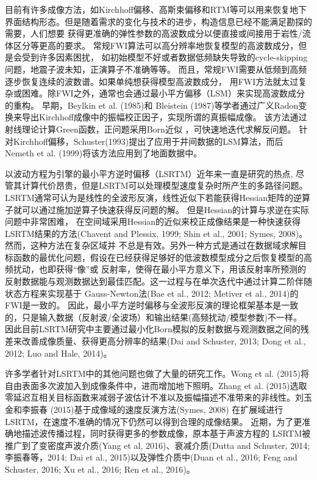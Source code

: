 目前有许多成像方法，如Kirchhoff偏移、高斯束偏移和RTM等可以用来恢复地下界面结构形态。但是随着需求的变化与技术的进步，构造信息已经不能满足勘探的需要，人们想要
获得更准确的弹性参数的高波数成分以便直接或间接用于岩性/流体区分等更高的要求。
常规FWI算法可以高分辨率地恢复模型的高波数成分，但是会受到许多因素困扰，
如初始模型不好或者数据低频缺失导致的cycle-skipping问题，地震子波未知，正演算子不准确等等。
而且，常规FWI需要从低频到高频逐步恢复连续的波数谱。如果单纯想获得模型高波数成分，
用FWI方法就太过复杂或困难。除FWI之外，通常也会通过最小平方偏移（LSM）来实现高波数成分的重构。
早期，Beylkin
et al. (1985)\cite{BeylkinEtAl1985}和
Bleistein (1987)\cite{Bleistein1987}等学者通过广义Radon变换来导出Kirchhoff成像中的振幅校正因子，实现所谓的真振幅成像。
该方法通过射线理论计算Green函数，正问题采用Born近似
，可快速地迭代求解反问题。
针对Kirchhoff偏移，Schuster(1993)\cite{Schuster1993}提出了应用于井间数据的LSM算法，而后Nemeth et al.
(1999)\cite{Nemeth1999}将该方法应用到了地面数据中。

以波动方程为引擎的最小平方逆时偏移（LSRTM）近年来一直是研究的热点,
尽管其计算代价昂贵，但是LSRTM可以处理模型速度复杂时所产生的多路径问题。
LSRTM通常可认为是线性的全波形反演，线性近似下若能获得Hessian矩阵的逆算子就可以通过施加逆算子快速获得反问题的解。
但是Hessian的计算与求逆在实际问题中非常困难，
在空间域采用Hessian的近似来校正成像结果是一种快速获得LSRTM结果的方法(Chavent and Plessix, 
1999\cite{ChaventEtAl1999}; Shin et al., 2001\cite{shin2001improved}; Symes,
2008\cite{Symes2008})。然而，这种方法在复杂区域并
不总是有效。另外一种方式是通过在数据域求解目标函数的最优化问题，假设在已经获得足够好的低波数模型成分之后恢复模型的高频扰动，也即获得“像”或
反射率，使得在最小平方意义下，用该反射率所预测的反射数据能与观测数据达到最佳匹配。这一过程与在单次迭代中通过计算二阶伴随状态方程来实现基于
Gauss-Newton法(Bae et al., 2012\cite{bae2012frequency}; Metiver et al.,
2014\cite{Metivier2014})的FWI是一致的。
因此，最小平方逆时偏移与全波形反演的理论框架基本是一致的，只是输入数据（反射波/全波场）和输出结果(高频扰动/模型参数)不一样。
因此目前LSRTM研究中主要通过最小化Born模拟的反射数据与观测数据之间的残差来改善成像质量、获得更高分辨率的结果(Dai and
Schuster, 2013\cite{Dai2013}; Dong et al., 2012\cite{Dong2012}; Luo and
Hale, 2014\cite{Luo2014})。

许多学者针对LSRTM中的其他问题也做了大量的研究工作。Wong et al.
(2015)\cite{WongEtAl2015}将自由表面多次波加入到成像条件中，进而增加地下照明。Zhang et al.
(2015)\cite{ZhangEtAl2015}选取零延迟互相关目标函数来减弱子波估计不准以及振幅描述不准带来的非线性。刘玉金和李振春
(2015)\cite{刘玉金2015}基于成像域的速度反演方法(Symes, 2008\cite{Symes2008a})
在扩展域进行LSRTM，在速度不准确的情况下仍然可以得到合理的成像结果。
近期，为了更准确地描述波传播过程，同时获得更多的参数成像，原本基于声波方程的
LSRTM被推广到了变密度声波介质(Yang et al, 2016)\cite{Yang2016}、衰减介质(Dutta and
Schuster, 2014\cite{DuttaEtAl2014}; 李振春等，2014\cite{李振春2014}; Dai et al.,
2015\cite{Dai2015})以及弹性介质中(Duan et al., 2016\cite{Duan2016}; Feng and Schuster,
2016\cite{Feng2016}; Xu et al., 2016\cite{Xu2016}; Ren et al., 2016\cite{RenEtAl2016})。

